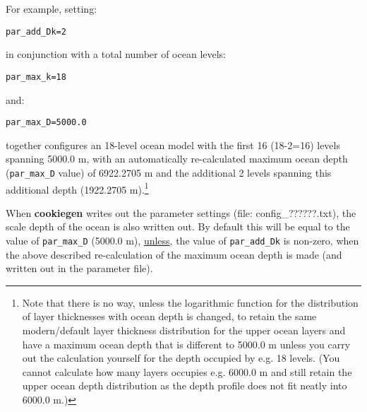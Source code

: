 For example, setting:

\vspace{1mm}
\texttt{par\_add\_Dk=2}
\vspace{1mm}

\noindent in conjunction with a total number of ocean levels:

\vspace{1mm}
\texttt{par\_max\_k=18}
\vspace{1mm}

\noindent and:

\vspace{1mm}
\texttt{par\_max\_D=5000.0}
\vspace{1mm}

\noindent together configures an 18-level ocean model with the first 16 (18-2=16) levels spanning  5000.0 m, with an automatically re-calculated maximum ocean depth (\texttt{par\_max\_D} value) of 6922.2705 m and the additional 2 levels spanning this additional depth (1922.2705 m).\footnote{Note that there is no way, unless the logarithmic function for the distribution of layer thicknesses with ocean depth is changed, to retain the same modern/default  layer thickness distribution for the upper ocean layers and have a maximum ocean depth that is different to 5000.0 m unless you carry out the calculation yourself for the depth occupied by e.g. 18 levels. (You cannot calculate how many layers occupies e.g. 6000.0 m and still retain the upper ocean depth distribution as the depth profile does not fit neatly into 6000.0 m.)}

When \textbf{cookiegen} writes out the parameter settings (file: \textsf{\footnotesize config\_??????.txt}), the scale depth of the ocean is also written out. By default this will be equal to the value of \texttt{par\_max\_D} (5000.0 m), \uline{unless}, the value of \texttt{par\_add\_Dk} is non-zero, when the above described re-calculation of the maximum ocean depth is made (and written out in the parameter file).

